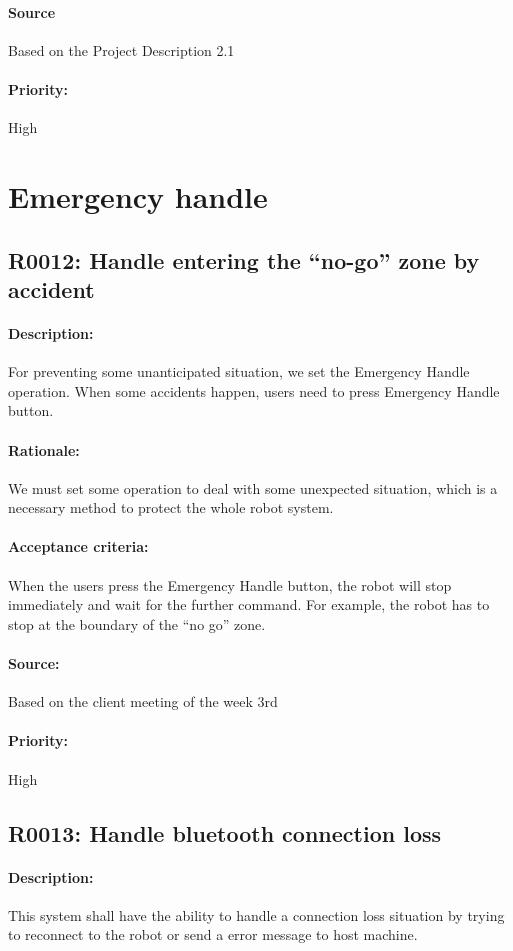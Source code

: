 \documentclass[11pt, a4paper]{report}
\begin{document}
\paragraph{Source}
Based on the Project Description 2.1
\paragraph{Priority:}
High


\section{Emergency handle}
\subsection{R0012: Handle entering the “no-go” zone by accident}
\paragraph{Description:}
For preventing some unanticipated situation, we set the Emergency Handle operation. When some accidents happen, users need to press Emergency Handle button.
\paragraph{Rationale:}
We must set some operation to deal with some unexpected situation, which is a necessary method to protect the whole robot system. 
\paragraph{Acceptance criteria:}
When the users press the Emergency Handle button, the robot will stop immediately and wait for the further command. For example, the robot has to stop at the boundary of the “no go” zone. 
\paragraph{Source:}
Based on the client meeting of the week 3rd
\paragraph{Priority:}
High  


\subsection{R0013: Handle bluetooth connection loss}
\paragraph{Description:}
This system shall have the ability to handle a connection loss situation by trying to reconnect to the robot or send a error message to host machine. 
\end{document}
